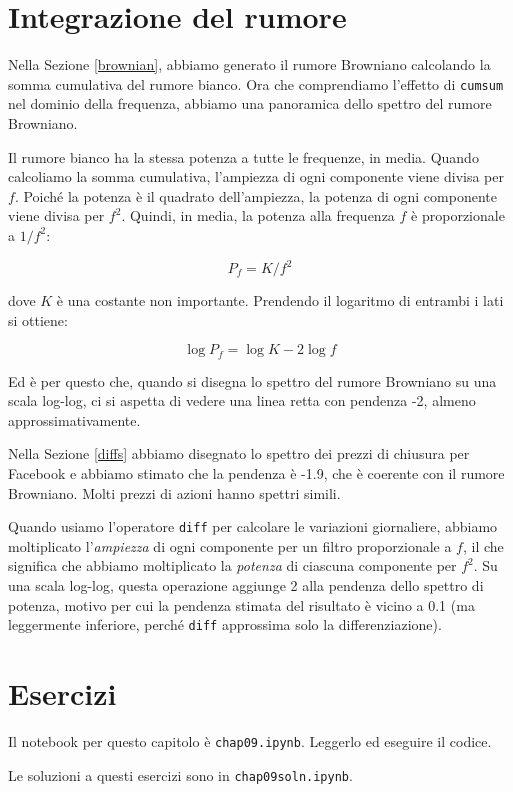 \documentclass[12pt,a4paper]{book}
\begin{document}
\section{Integrazione del rumore} 

Nella Sezione \ref{brownian}, abbiamo generato il rumore Browniano calcolando la somma cumulativa del rumore bianco. Ora che comprendiamo l'effetto di {\tt cumsum} nel dominio della frequenza, abbiamo una panoramica dello spettro del rumore Browniano.

Il rumore bianco ha la stessa potenza a tutte le frequenze, in media. Quando calcoliamo la somma cumulativa, l'ampiezza di ogni componente viene divisa per $f$. Poiché la potenza è il quadrato dell'ampiezza, la potenza di ogni componente viene divisa per $f^2$. Quindi, in media, la potenza alla frequenza $f$ è proporzionale a $1 / f^2$:

%
\[ P_f = K / f^2 \] 

%
dove $K$ è una costante non importante. Prendendo il logaritmo di entrambi i lati si ottiene:

%
\[ \log P_f = \log K - 2 \log f \] 

%
Ed è per questo che, quando si disegna lo spettro del rumore Browniano su una scala log-log, ci si aspetta di vedere una linea retta con pendenza -2, almeno approssimativamente.

Nella Sezione \ref{diffs} abbiamo disegnato lo spettro dei prezzi di chiusura per Facebook e abbiamo stimato che la pendenza è -1.9, che è coerente con il rumore Browniano. Molti prezzi di azioni hanno spettri simili.

Quando usiamo l'operatore {\tt diff} per calcolare le variazioni giornaliere, abbiamo moltiplicato l'{\em ampiezza} di ogni componente per un filtro proporzionale a $f$, il che significa che abbiamo moltiplicato la {\em potenza} di ciascuna componente per $f^2$. Su una scala log-log, questa operazione aggiunge 2 alla pendenza dello spettro di potenza, motivo per cui la pendenza stimata del risultato è vicino a 0.1 (ma leggermente inferiore, perché {\tt diff} approssima solo la differenziazione).

\section{Esercizi} 

Il notebook per questo capitolo è {\tt chap09.ipynb}. Leggerlo ed eseguire il codice.

Le soluzioni a questi esercizi sono in {\tt chap09soln.ipynb}.
\end{document}
